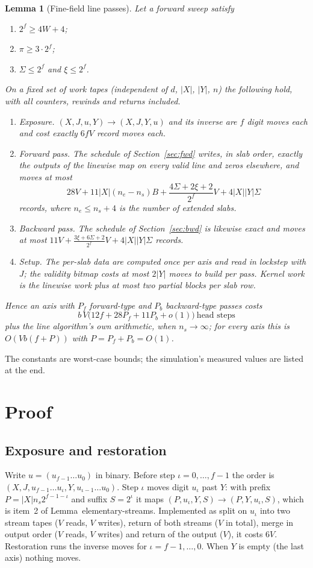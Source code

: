 \documentclass[11pt]{article}
\newtheorem{lemma}{Lemma}
\theoremstyle{definition}\newtheorem{definition}{Definition}
\theoremstyle{remark}\newtheorem*{remark}{Remark}
\begin{document}
\begin{lemma}[Fine-field line passes]\label{lem:fine}
Let a forward sweep satisfy
\begin{enumerate}
\item[(W1)] $2^f\ge4W+4$;
\item[(W2)] $\pi\ge3\cdot2^f$;
\item[(W3)] $\Sigma\le2^f$ and $\xi\le2^f$.
\end{enumerate}
On a fixed set of work tapes (independent of $d$, $|X|$, $|Y|$, $n$) the following hold, with
all counters, rewinds and returns included.
\begin{enumerate}
\item[(a)] \emph{Exposure.} $(X,J,u,Y)\to(X,J,Y,u)$ and its inverse are $f$ digit moves each and
cost exactly $6fV$ record moves each.
\item[(b)] \emph{Forward pass.} The schedule of Section~\ref{sec:fwd} writes, in slab order,
exactly the outputs of the linewise map on every valid line and zeros elsewhere, and moves at most
\[
 28V+11|X|(n_e-n_s)B+\frac{4\Sigma+2\xi+2}{2^f}V+4|X||Y|\Sigma
\]
records, where $n_e\le n_s+4$ is the number of extended slabs.
\item[(c)] \emph{Backward pass.} The schedule of Section~\ref{sec:bwd} is likewise exact and moves
at most $11V+\frac{3\xi+6\Sigma+2}{2^f}V+4|X||Y|\Sigma$ records.
\item[(d)] \emph{Setup.} The per-slab data are computed once per axis and read in lockstep with
$J$; the validity bitmap costs at most $2|Y|$ moves to build per pass. Kernel work is the
linewise work plus at most two partial blocks per slab row.
\end{enumerate}
Hence an axis with $P_f$ forward-type and $P_b$ backward-type passes costs
\[
 b\,V\bigl(12f+28P_f+11P_b+o(1)\bigr)\ \text{head steps}
\]
plus the line algorithm's own arithmetic, when $n_s\to\infty$; for every axis this is
$O(Vb(f+P))$ with $P=P_f+P_b=O(1)$.
\end{lemma}

The constants are worst-case bounds; the simulation's measured values are listed at the end.

\section{Proof}

\subsection{Exposure and restoration}
Write $u=(u_{f-1}\dots u_0)$ in binary. Before step $\iota=0,\dots,f-1$ the order is
$(X,J,u_{f-1}\dots u_\iota,Y,u_{\iota-1}\dots u_0)$. Step $\iota$ moves digit $u_\iota$ past $Y$:
with prefix $P=|X|n_s2^{f-1-\iota}$ and suffix $S=2^\iota$ it maps
$(P,u_\iota,Y,S)\to(P,Y,u_\iota,S)$, which is item~2 of Lemma~elementary-streams. Implemented as
split on $u_\iota$ into two stream tapes ($V$ reads, $V$ writes), return of both streams ($V$ in
total), merge in output order ($V$ reads, $V$ writes) and return of the output ($V$), it costs
$6V$. Restoration runs the inverse moves for $\iota=f-1,\dots,0$. When $Y$ is empty (the last
axis) nothing moves.
\end{document}
